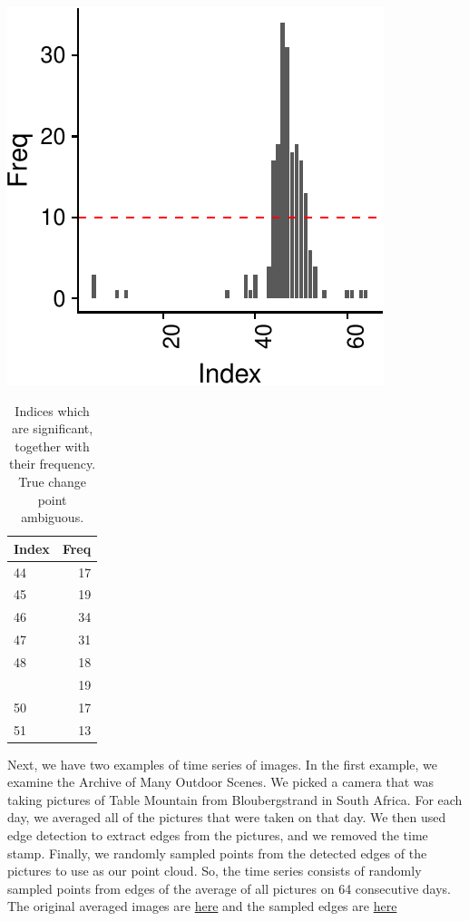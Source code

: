 \documentclass[smallextended]{svjour3}       %
\begin{document}
\begin{center}\includegraphics{springer_template_files/figure-latex/chunk_7_5-1} \end{center}

\begin{longtable}[t]{lr}
\caption{\label{tab:unnamed-chunk-3}Indices which are significant, together with their frequency. True change point ambiguous.}\\
\toprule
Index & Freq\\
\midrule
44 & 17\\
45 & 19\\
46 & 34\\
47 & 31\\
48 & 18\\
\addlinespace
49 & 19\\
50 & 17\\
51 & 13\\
\bottomrule
\end{longtable}

Next, we have two examples of time series of images. In the first
example, we examine the Archive of Many Outdoor Scenes. We picked a
camera that was taking pictures of Table Mountain from Bloubergstrand in
South Africa. For each day, we averaged all of the pictures that were
taken on that day. We then used edge detection to extract edges from the
pictures, and we removed the time stamp. Finally, we randomly sampled
points from the detected edges of the pictures to use as our point
cloud. So, the time series consists of randomly sampled points from
edges of the average of all pictures on 64 consecutive days. The
original averaged images are
\href{http://stat.slu.edu/~speegle/Kaapstad.gif}{here} and the sampled
edges are \href{http://stat.slu.edu/~speegle/Slide4.gif}{here}
\end{document}
